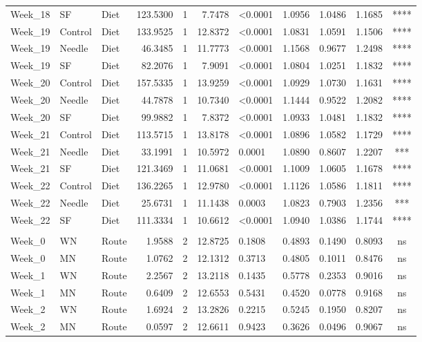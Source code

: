 \documentclass[
  12pt,
  letterpaper,
]{article}
\begin{document}
\begin{longtable}{lllrrrlrrrc}
Week\_18 & SF & Diet & 123.5300 & 1 & 7.7478 & <0.0001 & 1.0956 & 1.0486 & 1.1685 & **** \\ 
Week\_19 & Control & Diet & 133.9525 & 1 & 12.8372 & <0.0001 & 1.0831 & 1.0591 & 1.1506 & **** \\ 
Week\_19 & Needle & Diet & 46.3485 & 1 & 11.7773 & <0.0001 & 1.1568 & 0.9677 & 1.2498 & **** \\ 
Week\_19 & SF & Diet & 82.2076 & 1 & 7.9091 & <0.0001 & 1.0804 & 1.0251 & 1.1832 & **** \\ 
Week\_20 & Control & Diet & 157.5335 & 1 & 13.9259 & <0.0001 & 1.0929 & 1.0730 & 1.1631 & **** \\ 
Week\_20 & Needle & Diet & 44.7878 & 1 & 10.7340 & <0.0001 & 1.1444 & 0.9522 & 1.2082 & **** \\ 
Week\_20 & SF & Diet & 99.9882 & 1 & 7.8372 & <0.0001 & 1.0933 & 1.0481 & 1.1832 & **** \\ 
Week\_21 & Control & Diet & 113.5715 & 1 & 13.8178 & <0.0001 & 1.0896 & 1.0582 & 1.1729 & **** \\ 
Week\_21 & Needle & Diet & 33.1991 & 1 & 10.5972 & 0.0001 & 1.0890 & 0.8607 & 1.2207 & *** \\ 
Week\_21 & SF & Diet & 121.3469 & 1 & 11.0681 & <0.0001 & 1.1009 & 1.0605 & 1.1678 & **** \\ 
Week\_22 & Control & Diet & 136.2265 & 1 & 12.9780 & <0.0001 & 1.1126 & 1.0586 & 1.1811 & **** \\ 
Week\_22 & Needle & Diet & 25.6731 & 1 & 11.1438 & 0.0003 & 1.0823 & 0.7903 & 1.2356 & *** \\ 
Week\_22 & SF & Diet & 111.3334 & 1 & 10.6612 & <0.0001 & 1.0940 & 1.0386 & 1.1744 & **** \\ 
\midrule\addlinespace[2.5pt]
\multicolumn{11}{l}{Split by Diet} \\ 
\midrule\addlinespace[2.5pt]
Week\_0 & WN & Route & 1.9588 & 2 & 12.8725 & 0.1808 & 0.4893 & 0.1490 & 0.8093 & ns \\ 
Week\_0 & MN & Route & 1.0762 & 2 & 12.1312 & 0.3713 & 0.4805 & 0.1011 & 0.8476 & ns \\ 
Week\_1 & WN & Route & 2.2567 & 2 & 13.2118 & 0.1435 & 0.5778 & 0.2353 & 0.9016 & ns \\ 
Week\_1 & MN & Route & 0.6409 & 2 & 12.6553 & 0.5431 & 0.4520 & 0.0778 & 0.9168 & ns \\ 
Week\_2 & WN & Route & 1.6924 & 2 & 13.2826 & 0.2215 & 0.5245 & 0.1950 & 0.8207 & ns \\ 
Week\_2 & MN & Route & 0.0597 & 2 & 12.6611 & 0.9423 & 0.3626 & 0.0496 & 0.9067 & ns \\ 

\end{longtable}
\end{document}
